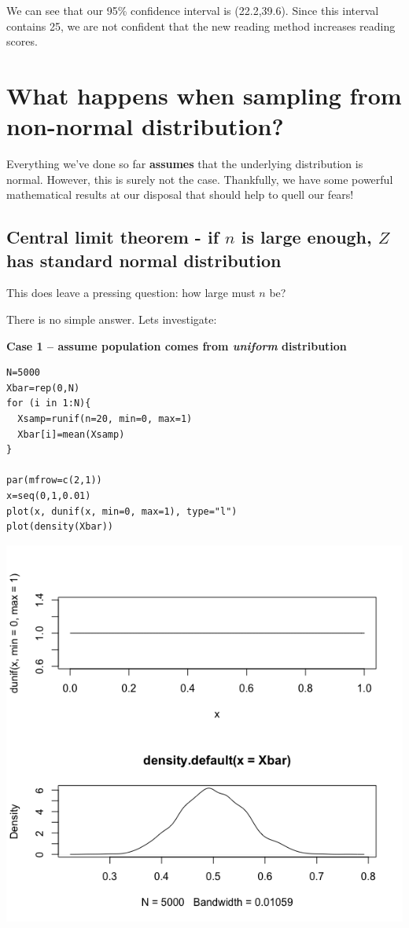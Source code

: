 \documentclass[11pt]{article}
\begin{document}
We can see that our 95\% confidence interval is (22.2,39.6).  Since this interval contains 25, we are not confident that the new reading method increases reading scores.

\section*{What happens when sampling from non-normal distribution?}
\label{sec-3}
Everything we've done so far \textbf{assumes} that the underlying distribution is normal.  However, this is surely not the case.  Thankfully, we have some powerful mathematical results at our disposal that should help to quell our fears!
\subsection*{Central limit theorem - if $n$ is large enough, $Z$ has standard normal distribution}
\label{sec-3-1}

This does leave a pressing question: how large must $n$ be?

There is no simple answer. Lets investigate:

\textbf{Case 1 -- assume population comes from \emph{uniform} distribution}

\begin{verbatim}
N=5000
Xbar=rep(0,N)
for (i in 1:N){
  Xsamp=runif(n=20, min=0, max=1)
  Xbar[i]=mean(Xsamp)
}

par(mfrow=c(2,1))
x=seq(0,1,0.01)
plot(x, dunif(x, min=0, max=1), type="l")
plot(density(Xbar))
\end{verbatim}

\includegraphics[width=.9\linewidth]{figures/week3/uniform.png}
\end{document}
